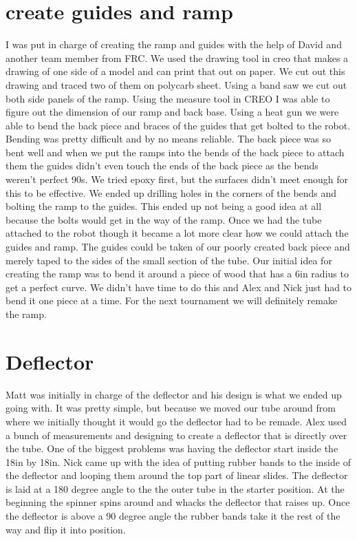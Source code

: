 \section*{create guides and ramp}
I was put in charge of creating the ramp and guides with the help of David and another team member from FRC. We used the drawing tool in creo that makes a drawing of one side of a model and can print that out on paper. We cut out this drawing and traced two of them on polycarb sheet. Using a band saw we cut out both side panels of the ramp. Using the measure tool in CREO I was able to figure out the dimension of our ramp and back base. Using a heat gun we were able to bend the back piece and braces of the guides that get bolted to the robot. Bending was pretty difficult and by no means reliable. The back piece was so bent well and when we put the ramps into the bends of the back piece to attach them the guides didn’t even touch the ends of the back piece as the bends weren’t perfect 90s. We tried epoxy first, but the surfaces didn’t meet enough for this to be effective. We ended up drilling holes in the corners of the bends and bolting the ramp to the guides. This ended up not being a good idea at all because the bolts would get in the way of the ramp. Once we had the tube attached to the robot though it became a lot more clear how we could attach the guides and ramp. The guides could be taken of our poorly created back piece and merely taped to the sides of the small section of the tube. Our initial idea for creating the ramp was to bend it around a piece of wood that has a 6in radius to get a perfect curve. We didn’t have time to do this and Alex and Nick just had to bend it one piece at a time. For the next tournament we will definitely remake the ramp.

\section*{Deflector}
Matt was initially in charge of the deflector and his design is what we ended up going with. It was pretty simple, but because we moved our tube around from where we initially thought it would go the deflector had to be remade. Alex used a bunch of measurements and designing to create a deflector that is directly over the tube. One of the biggest problems was having the deflector start inside the 18in by 18in. Nick came up with the idea of putting rubber bands to the inside of the deflector and looping them around the top part of linear slides. The deflector is laid at a 180 degree angle to the the outer tube in the starter position. At the beginning the spinner spins around and whacks the deflector that raises up. Once the deflector is above a 90 degree angle the rubber bands take it the rest of the way and flip it into position. 

